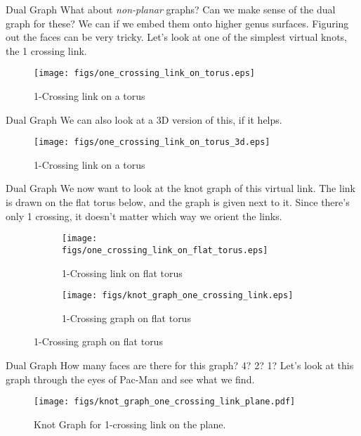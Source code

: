 \documentclass{beamer}
\begin{document}
    \begin{frame}{Dual Graph}
        What about \textit{non-planar} graphs? Can we make sense of the dual graph
        for these? We can if we embed them onto higher genus surfaces. Figuring out
        the faces can be very tricky. Let's look at one of the simplest virtual
        knots, the 1 crossing link.
        \begin{figure}
            \centering
            \texttt{[image: figs/one\_crossing\_link\_on\_torus.eps]}
            \caption{1-Crossing link on a torus}
            \label{fig:one_crossing_link_on_torus}
        \end{figure}
    \end{frame}
    \begin{frame}{Dual Graph}
        We can also look at a 3D version of this, if it helps.
        \begin{figure}
            \centering
            \texttt{[image: figs/one\_crossing\_link\_on\_torus\_3d.eps]}
            \caption{1-Crossing link on a torus}
            \label{fig:one_crossing_link_on_torus_3d}
        \end{figure}
    \end{frame}
    \begin{frame}{Dual Graph}
        We now want to look at the knot graph of this virtual link.
        The link is drawn on the flat torus below, and the graph is given
        next to it. Since there's only 1 crossing, it doesn't matter which way
        we orient the links.
        \begin{figure}
            \centering
            \begin{subfigure}[b]{0.49\textwidth}
                \texttt{[image: figs/one\_crossing\_link\_on\_flat\_torus.eps]}
                \caption{1-Crossing link on flat torus}
                \label{fig:one_crossing_link_flat_torus}
            \end{subfigure}
            \begin{subfigure}[b]{0.49\textwidth}
                \texttt{[image: figs/knot\_graph\_one\_crossing\_link.eps]}
                \caption{1-Crossing graph on flat torus}
                \label{fig:one_crossing_graph_flat_torus}
            \end{subfigure}
        \end{figure}
    \end{frame}
    \begin{frame}{Dual Graph}
        How many faces are there for this graph? 4? 2? 1?
        Let's look at this graph through the eyes of Pac-Man and see
        what we find.
        \begin{figure}
            \centering
            \texttt{[image: figs/knot\_graph\_one\_crossing\_link\_plane.pdf]}
            \caption{Knot Graph for 1-crossing link on the plane.}
            \label{fig:knot_graph_one_crossing_link_plane}
        \end{figure}
    \end{frame}
\end{document}
